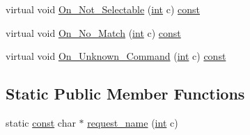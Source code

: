\begin{DoxyCompactItemize}
\item 
virtual void \hyperlink{class_n_curses_menu_abffb49e906ca344b0c60840a2f10aa38}{On\-\_\-\-Not\-\_\-\-Selectable} (\hyperlink{term__entry_8h_ad65b480f8c8270356b45a9890f6499ae}{int} c) \hyperlink{term__entry_8h_a57bd63ce7f9a353488880e3de6692d5a}{const} 
\item 
virtual void \hyperlink{class_n_curses_menu_a1e7ecf5d961cc02cedc31222e11298f2}{On\-\_\-\-No\-\_\-\-Match} (\hyperlink{term__entry_8h_ad65b480f8c8270356b45a9890f6499ae}{int} c) \hyperlink{term__entry_8h_a57bd63ce7f9a353488880e3de6692d5a}{const} 
\item 
virtual void \hyperlink{class_n_curses_menu_ae6c9bd57fd6db580a4191d18219feeec}{On\-\_\-\-Unknown\-\_\-\-Command} (\hyperlink{term__entry_8h_ad65b480f8c8270356b45a9890f6499ae}{int} c) \hyperlink{term__entry_8h_a57bd63ce7f9a353488880e3de6692d5a}{const} 
\end{DoxyCompactItemize}
\subsection*{Static Public Member Functions}
\begin{DoxyCompactItemize}
\item 
static \hyperlink{term__entry_8h_a57bd63ce7f9a353488880e3de6692d5a}{const} char $\ast$ \hyperlink{class_n_curses_menu_ac8aa7a787b3fe30693266e00120520fa}{request\-\_\-name} (\hyperlink{term__entry_8h_ad65b480f8c8270356b45a9890f6499ae}{int} c)
\end{DoxyCompactItemize}
